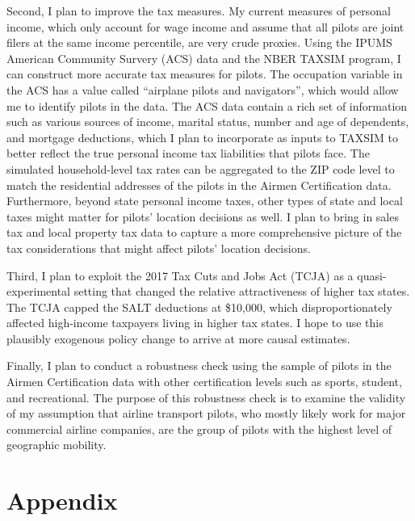 \documentclass[11pt]{article}
\begin{document}
Second, I plan to improve the tax measures. My current measures of personal income, which only account for wage income and assume that all pilots are joint filers at the same income percentile, are very crude proxies. Using the IPUMS American Community Survery (ACS) data and the NBER TAXSIM program, I can construct more accurate tax measures for pilots. The occupation variable in the ACS has a value called ``airplane pilots and navigators'', which would allow me to identify pilots in the data. The ACS data contain a rich set of information such as various sources of income, marital status, number and age of dependents, and mortgage deductions, which I plan to incorporate as inputs to TAXSIM to better reflect the true personal income tax liabilities that pilots face. The simulated household-level tax rates can be aggregated to the ZIP code level to match the residential addresses of the pilots in the Airmen Certification data. Furthermore, beyond state personal income taxes, other types of state and local taxes might matter for pilots' location decisions as well. I plan to bring in sales tax and local property tax data to capture a more comprehensive picture of the tax considerations that might affect pilots' location decisions.
 
 Third, I plan to exploit the 2017 Tax Cuts and Jobs Act (TCJA) as a quasi-experimental setting that changed the relative attractiveness of higher tax states. The TCJA capped the SALT deductions at \$10,000, which disproportionately affected high-income taxpayers living in higher tax states. I hope to use this plausibly exogenous policy change to arrive at more causal estimates.
 
 Finally, I plan to conduct a robustness check using the sample of pilots in the Airmen Certification data with other certification levels such as sports, student, and recreational. The purpose of this robustness check is to examine the validity of my assumption that airline transport pilots, who mostly likely work for major commercial airline companies, are the group of pilots with the highest level of geographic mobility.



\newpage
\nocite{*}
\printbibliography

\newpage
\appendix

\section{Appendix}
\end{document}

